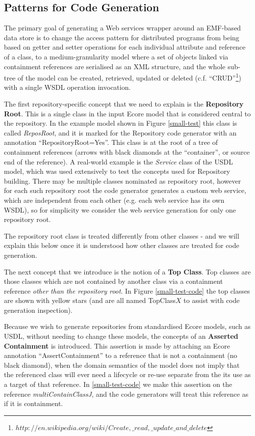 \documentclass[11pt]{article}
\begin{document}
\subsection{Patterns for Code Generation}

The primary goal of generating a Web services wrapper around an EMF-based data store is to change the access pattern for distributed programs from being based on getter and setter operations for each individual attribute and reference of a class, to a medium-granularity model where a set of objects linked via containment references are serialised as an XML structure, and the whole sub-tree of the model can be created, retrieved, updated or deleted (c.f. ``CRUD''\footnote{$http://en.wikipedia.org/wiki/Create,\_read,\_update\_and\_delete$}) with a single WSDL operation invocation.

The first repository-specific concept that we need to explain is the {\bf Repository Root}. This is a single class in the input Ecore model that is considered central to the repository. In the example model shown in Figure \ref{small-test} this class is called {\em ReposRoot}, and it is marked for the Repository code generator with an annotation ``RepositoryRoot=Yes''. This class is at the root of a tree of containment references (arrows with black diamonds at the ``container'', or source end of the reference).   A real-world example is the {\em Service} class of the USDL model, which was used extensively to test the concepts used for Repository building. There may be multiple classes nominated as repository root, however for each such repository root the code generator generates a custom web service, which are independent from each other (e.g. each web service has its own WSDL), so for simplicity we consider the web service generation for only one repository root. 

The repository root class is treated differently from other classes - and we will explain this below once it is understood how other classes are treated for code generation.

The next concept that we introduce is the notion of a {\bf Top Class}. Top classes are those classes which are not contained by another class via a containment reference {\em other than the repository root}. In Figure \ref{small-test-code} the top classes are shown with yellow stars (and are all named TopClass$X$ to assist with code generation inspection). 

Because we wish to generate repositories from standardised Ecore models, such as USDL, without needing to change these models, the concepts of an {\bf Asserted Containment} is introduced. This assertion is made by attaching an Ecore annotation ``AssertContainment'' to a reference that is not a containment (no black diamond), when the domain semantics of the model does not imply that the referenced class will ever need a lifecycle or re-use separate from the its use as a target of that reference. In  \ref{small-test-code} we make this assertion on the reference {\em multiContainClassJ}, and the code generators will treat this reference as if it is containment.
\end{document}
